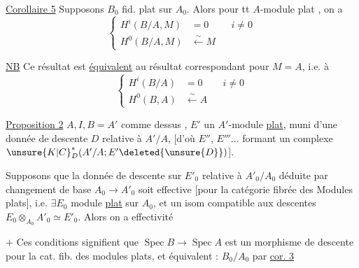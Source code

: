 \uline{Corollaire 5} \quad Supposons $B_0$ fid. plat sur $A_0$. Alors pour tt $A$-module plat , on a
\[
\left\{\begin{aligned}H^i(B/A,M)&=0 &&i\ne0\\
H^0(B/A,M)&\xleftarrow{\sim}M\end{aligned}\right.
\]

\uline{NB} \quad Ce résultat est \uline{équivalent} au résultat correspondant pour $M=A$, i.e. à
\[
\left\{\begin{aligned}H^i(B/A)&=0 &&i\ne0\\
H^0(B,A)&\xleftarrow{\sim}A\end{aligned}\right.
\]

\uline{Proposition 2} \quad $A,I,B=A'$ comme dessus  , $E'$ un $A'$-module \uline{plat}, muni d'une donnée de descente $D$ relative à $A'/A$, [d'où $E''$, $E'''\ldots$ formant un complexe $\unsure{K|C}_D^*(A'/A;E'\deleted{\unsure{D}})$].


Supposons que la donnée de descente sur $E'_0$ relative à $A'_0/A_0$ déduite par changement de base $A_0\longrightarrow A'_0$ soit effective [pour la catégorie fibrée des Modules plats], i.e. $\exists E_0$ module \uline{plat} sur $A_0$, et un isom compatible aux descentes $E_0\otimes_{A_0}A'_0\simeq E'_0$. Alors on a effectivité

\textcircled{$+$} Ces conditions  signifient que $\operatorname{Spec}B\longrightarrow\operatorname{Spec}A$ est un morphisme de descente pour la cat. fib. des modules plats, et équivalent :  $B_0/A_0$ par \uline{cor. 3}

